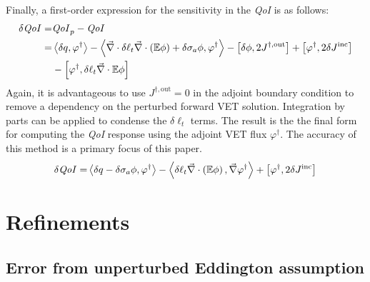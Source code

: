 \documentclass[12pt]{report}
\newcommand{\bra}{\left\langle}
\newcommand{\ket}{\right\rangle}
\newcommand{\sbra}{\left[}
\newcommand{\sket}{\right]}
\renewcommand{\div}{\vec{\nabla} \cdot}
\newcommand{\grad}{\vec{\nabla}}
\newcommand{\vefadj}{\varphi^\dag}
\newcommand{\Edd}{\mathbb{E}}
\newcommand{\siga}{\sigma_a}
\newcommand{\isigt}{\ell_t}
\newcommand{\scalSource}{q}
\newcommand{\qoi}{{\it QoI}\xspace}
\begin{document}
Finally, a first-order expression for the sensitivity in the \qoi is as follows:
\begin{equation}
\label{QoIVETAdjlong}
\begin{split}
\delta \qoi =& \qoi_p - \qoi \\ 
=& \bra \delta \scalSource , \vefadj \ket - \bra \div \delta \isigt \div \left( \Edd \phi \right)  + \delta \siga \phi, \vefadj \ket 
- \sbra \delta \phi, 2J^{\dag,\text{out}} \sket + \sbra \vefadj, 2 \delta J^{\text{inc}} \sket \\
& - \sbra \vefadj, \delta \isigt \div \Edd \phi \sket 
\end{split}
\end{equation}
Again, it is advantageous to use $J^{\dag,\text{out}}=0$ in the adjoint boundary condition to remove a dependency on the 
perturbed forward VET solution. Integration by parts can be applied to condense the $\delta \isigt$ terms. The result is the the final form for computing the \qoi response using the adjoint VET flux $\vefadj$. The accuracy of this method is a primary focus of this paper.
\begin{equation}
\label{VETsens}
\begin{split}
\delta \qoi =&  \bra \delta \scalSource - \delta \siga \phi, \vefadj \ket  - \bra \delta \isigt \div \left( \Edd \phi \right) , \grad \vefadj \ket
 + \sbra \vefadj, 2 \delta J^{\text{inc}} \sket \\
\end{split}
\end{equation}



\section{Refinements}

\subsection{Error from unperturbed Eddington assumption}
\end{document}
